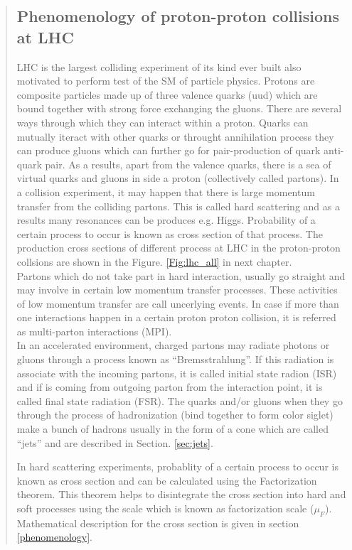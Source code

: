 \begin{abstract}
	\subsection{Phenomenology of proton-proton collisions at LHC}
LHC is the largest colliding experiment of its kind ever built also motivated to perform test of the SM of particle physics. Protons are composite particles made up of three valence quarks (uud) which are bound together with strong force exchanging the gluons. There are several ways through which they can interact within a proton. Quarks can mutually iteract with other quarks or throught annihilation process they can produce gluons which can further go for pair-production of quark anti-quark pair. As a results, apart from the valence quarks, there is a sea of virtual quarks and gluons in side a proton (collectively called partons).
In a collision experiment, it may happen that there is large momentum transfer from the colliding partons. This is called hard scattering and as a results many resonances can be produces e.g. Higgs. Probability of a certain process to occur is known as cross section of that process.
The production cross sections of different process at LHC in the proton-proton collsions are shown in the Figure. \ref{Fig:lhc_all} in next chapter.\\
Partons which do not take part in hard interaction, usually go straight and may involve in certain low momentum transfer processes. These activities of low momentum transfer are call uncerlying events. In case if more than one interactions happen in a certain proton proton collision, it is referred as multi-parton interactions (MPI).\\
In an accelerated environment, charged partons may radiate photons or gluons through a process known as ``Bremsstrahlung''. If this radiation is associate with the incoming partons, it is called initial state radion (ISR) and if is coming from outgoing parton from the interaction point, it is called final state radiation (FSR).
The quarks and/or gluons when they go through the process of hadronization (bind together to form color siglet) make a bunch of hadrons usually in the form of a cone which are called ``jets'' and are described in Section. \ref{sec:jets}. %
\par In hard scattering  experiments, probablity of a certain process to occur is known as cross section and can be calculated using the Factorization theorem.
This theorem helps to disintegrate the cross section into hard and soft processes using the scale which is known as factorization scale ($\mu_{F}$).\\
Mathematical description for the cross section is given in section \ref{phenomenology}.

\end{abstract}
